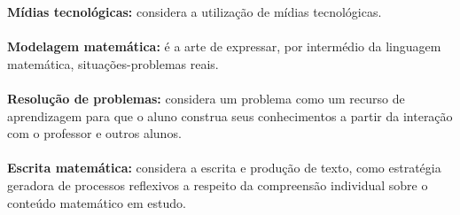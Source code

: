 \documentclass[a4paper, 12pt]{article}
\begin{document}
\begin{enumerate}
  \textbf{Mídias tecnológicas:} considera a utilização de mídias tecnológicas. \\ \\
  \textbf{Modelagem matemática:} é a arte de expressar, por intermédio da linguagem matemática, situações-problemas reais. \\ \\
  \textbf{Resolução de problemas:} considera um problema como um recurso de aprendizagem para que o aluno construa seus conhecimentos a partir da interação com o professor e outros alunos. \\ \\
  \textbf{Escrita matemática:} considera a escrita e produção de texto, como estratégia geradora de processos reflexivos a respeito da compreensão individual sobre o conteúdo matemático em estudo.
 \end{enumerate}
\end{document}
